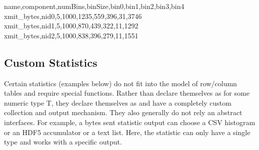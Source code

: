\begin{ViFile}
name,component,numBins,binSize,bin0,bin1,bin2,bin3,bin4
xmit_bytes,nid0,5,1000,1235,559,396,31,3746
xmit_bytes,nid1,5,1000,870,439,322,11,1292
xmit_bytes,nid2,5,1000,838,396,279,11,1551
\end{ViFile}

\subsection{Custom Statistics}\label{subsec:customStats}
Certain statistics (examples below) do not fit into the model of row/column tables and require special  functions.
Rather than declare themselves as  for some numeric type T, they declare themselves as  and have a completely custom collection and output mechanism.
They also generally do not rely an abstract interfaces. 
For example, a bytes sent statistic output can choose a CSV histogram or an HDF5 accumulator or a text list.
Here, the statistic can only have a single type and works with a specific output.
